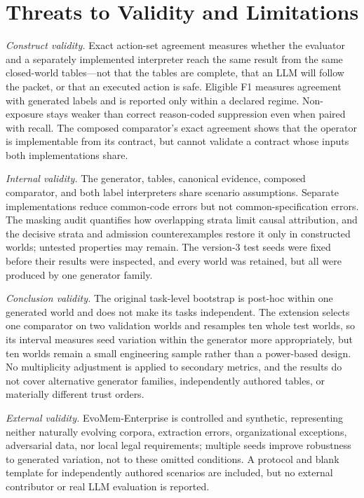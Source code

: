 \documentclass[conference]{IEEEtran}
\begin{document}
\section{Threats to Validity and Limitations}
\label{sec:validity}
\textit{Construct validity.} Exact action-set agreement measures whether the evaluator and a separately implemented interpreter reach the same result from the same closed-world tables---not that the tables are complete, that an LLM will follow the packet, or that an executed action is safe. Eligible F1 measures agreement with generated labels and is reported only within a declared regime. Non-exposure stays weaker than correct reason-coded suppression even when paired with recall. The composed comparator's exact agreement shows that the operator is implementable from its contract, but cannot validate a contract whose inputs both implementations share.

\textit{Internal validity.} The generator, tables, canonical evidence, composed comparator, and both label interpreters share scenario assumptions. Separate implementations reduce common-code errors but not common-specification errors. The masking audit quantifies how overlapping strata limit causal attribution, and the decisive strata and admission counterexamples restore it only in constructed worlds; untested properties may remain. The version-3 test seeds were fixed before their results were inspected, and every world was retained, but all were produced by one generator family.

\textit{Conclusion validity.} The original task-level bootstrap is post-hoc within one generated world and does not make its tasks independent. The extension selects one comparator on two validation worlds and resamples ten whole test worlds, so its interval measures seed variation within the generator more appropriately, but ten worlds remain a small engineering sample rather than a power-based design. No multiplicity adjustment is applied to secondary metrics, and the results do not cover alternative generator families, independently authored tables, or materially different trust orders.

\textit{External validity.} EvoMem-Enterprise is controlled and synthetic, representing neither naturally evolving corpora, extraction errors, organizational exceptions, adversarial data, nor local legal requirements; multiple seeds improve robustness to generated variation, not to these omitted conditions. A protocol and blank template for independently authored scenarios are included, but no external contributor or real LLM evaluation is reported.
\end{document}

